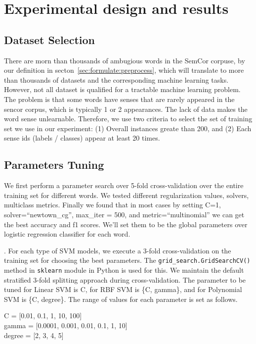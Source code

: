 \section{Experimental design and results}

\subsection{Dataset Selection}
\label{sec:results:data}

There are morn than thousands of ambugious words in the SemCor corpuse, by our
definition in secton~\ref{sec:formulate:preprocess}, which will translate to
more than thousands of datasets and the corresponding machine learning tasks.
However, not all dataset is qualified for a tractable machine learning problem. 
The problem is that some words have senses that are rarely appeared in the
sencor corpus, which is typically 1 or 2 appearances.
The lack of data makes the word sense unlearnable.
Therefore, we use two criteria to select the set of training set we use in our
experiment:
(1) Overall instances greate than 200, 
and (2) Each sense ids (labels / classes) appear at least 20 times.

\subsection{Parameters Tuning}

We first perform a parameter search over 5-fold cross-validation over the entire
training set for different words. We tested different regularization values,
solvers, multiclass metrics. Finally we found that in most cases by setting C=1,
solver=``newtown\_cg'', max\_iter = 500, and metric=``multinomial'' we can get
the best accuracy and f1 scores. We'll set them to be the global parameters over
logistic regression classifier for each word. 

.
For each type of SVM models, we execute a 3-fold cross-validation on the
training set for choosing the best parameters. The
\texttt{grid\_search.GridSearchCV()} method in \texttt{sklearn} module in Python
is used for this. We maintain the default stratified 3-fold splitting approach
during cross-validation. The parameter to be tuned for Linear SVM is C, for RBF
SVM is \{C, gamma\}, and for Polynomial SVM is \{C, degree\}. The range of
values for each parameter is set as follows.

C = [0.01, 0.1, 1, 10, 100] \\
gamma = [0.0001, 0.001, 0.01, 0.1, 1, 10] \\
degree = [2, 3, 4, 5]

